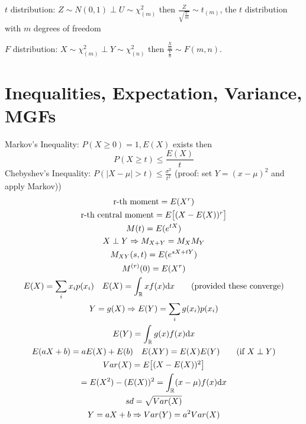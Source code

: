 \documentclass[letterpaper, 8pt]{extarticle}
\begin{document}
\begin{multicols*}{3}
	$t$ distribution: $Z\sim N(0,1)\perp U\sim\chi^2_{(m)}$ then $\frac{Z}{\sqrt{\frac{U}{m}}}\sim t_{(m)}$, the $t$ distribution with $m$ degrees of freedom
	
	$F$ distribution: $X\sim\chi^2_{(m)}\perp Y\sim\chi^2_{(n)}$ then $\frac{\frac{X}{m}}{\frac{Y}{n}}\sim F(m,n)$.
	
	\section{Inequalities, Expectation, Variance, MGFs}
	
	Markov's Inequality: $P(X\geq 0)=1, E(X)$ exists then 
	\[P(X\geq t)\leq \frac{E(X)}{t}\]
	Chebyshev's Inequality: $P(|X-\mu|>t)\leq\frac{\sigma^2}{t^2}$ (proof: set $Y=(x-\mu)^2$ and apply Markov))
	\begin{gather*}
		\text{r-th moment}=E(X^r) \\
		\text{r-th central moment}=E\mqty[(X-E(X))^r]\\
		M(t)=E(e^{tX})\\
		X\perp Y\IMP M_{X+Y}=M_XM_Y\\
		M_{XY}(s,t)=E(e^{sX+tY})\\
		M^{(r)}(0)=E(X^r)\\
		E(X)=\sum_ix_ip(x_i)\quad E(X)=\int_\R xf(x)\dd x \tag{provided these converge} \\
		Y=g(X)\IMP E(Y)=\sum_ig(x_i)p(x_i) \\ E(Y)=\int_\R g(x)f(x)\dd x \\
		E(aX+b)=aE(X)+E(b)\quad E(XY)=E(X)E(Y) \tag{if $X\perp Y$} \\
		Var(X)=E\mqty[(X-E(X))^2]\\
		=E(X^2)-(E(X))^2=\int_\R(x-\mu)f(x)\dd x \\
		sd=\sqrt{Var(X)} \\
		Y=aX+b\IMP Var(Y)=a^2Var(X)
	\end{gather*}

\end{multicols*}
\end{document}
